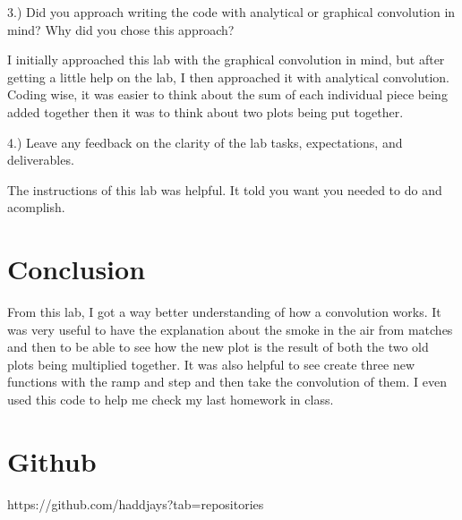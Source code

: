 \documentclass[11pt,a4]{report}
\begin{document}
3.) Did you approach writing the code with analytical or graphical convolution in mind? Why did you chose this approach?

 I initially approached this lab with the graphical convolution in mind, but after getting a little help on the lab, I then approached it with analytical convolution. Coding wise, it was easier to think about the sum of each individual piece being added together then it was to think about two plots being put together. 
 
 4.) Leave any feedback on the clarity of the lab tasks, expectations, and deliverables.
 
 The instructions of this lab was helpful. It told you want you needed to do and acomplish. 


\section{Conclusion}
From this lab, I got a way better understanding of how a convolution works. It was very useful to have the explanation about the smoke in the air from matches and then to be able to see how the new plot is the result of both the two old plots being multiplied together. It was also helpful to see create three new functions with the ramp and step and then take the convolution of them. I even used this code to help me check my last homework in class. 



\section{Github}
https://github.com/haddjays?tab=repositories
\end{document}
